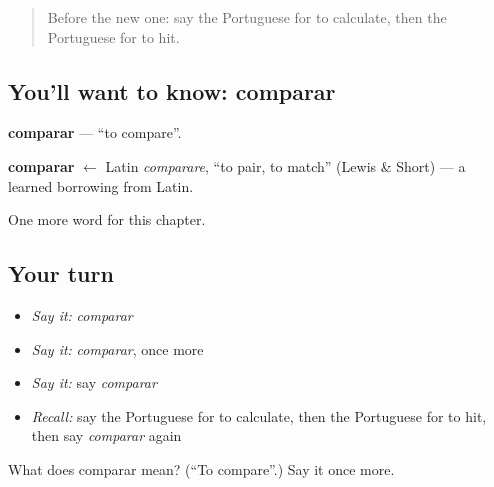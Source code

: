 \label{lesson:PT-C204-comparar}



\begin{quote}
Before the new one: say the Portuguese for to calculate, then the Portuguese for to hit.
\end{quote}

\subsection*{You'll want to know: comparar}
\textbf{comparar} — \textquotedblleft{}to compare\textquotedblright{}.

\begin{cousinweb}
\textbf{comparar} $\leftarrow$ Latin \emph{comparare}, \textquotedblleft{}to pair, to match\textquotedblright{} (Lewis \& Short) — a learned borrowing from Latin.
\end{cousinweb}

\begin{grammarlens}[title={What you've built}]
One more word for this chapter.
\end{grammarlens}

\subsection*{Your turn}
\begin{itemize}
\raggedright
  \item \emph{Say it:} \emph{comparar}
  \item \emph{Say it:} \emph{comparar}, once more
  \item \emph{Say it:} say \emph{comparar}
  \item \emph{Recall:} say the Portuguese for to calculate, then the Portuguese for to hit, then say \emph{comparar} again
\end{itemize}

\begin{tcolorbox}[breakable,colback=teal!4,colframe=teal!35!black,title={Before you move on}]
What does comparar mean? (\textquotedblleft{}To compare\textquotedblright{}.) Say it once more.
\end{tcolorbox}
